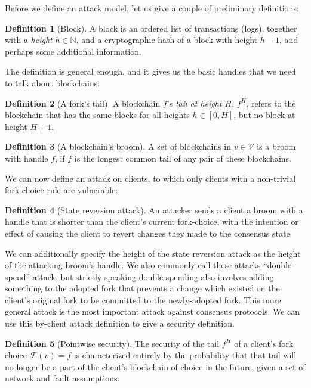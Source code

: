 \documentclass[11pt,a4paper]{article}
\theoremstyle{plain}
\theoremstyle{definition}
\newtheorem{defn}{Definition}
\begin{document}
Before we define an attack model, let us give a couple of preliminary definitions:

\begin{defn}[Block]
A block is an ordered list of transactions (logs), together with a \emph{height} $h \in \mathbb{N}$, and a cryptographic hash of a block with height $h - 1$, and perhaps some additional information. 
\end{defn}

The definition is general enough, and it gives us the basic handles that we need to talk about blockchains:

\begin{defn}[A fork's tail]
A blockchain $f$'s \emph{tail at height $H$}, $f^H$, refers to the blockchain that has the same blocks for all heights $h \in [0,H]$, but no block at height $H + 1$.
\end{defn}

\begin{defn}[A blockchain's broom]
A set of blockchains in $v \in \mathcal{V}$ is a broom with handle $f$, if $f$ is the longest common tail of any pair of these blockchains.
\end{defn}

We can now define an attack on clients, to which only clients with a non-trivial fork-choice rule are vulnerable:

\begin{defn}[State reversion attack]
An attacker sends a client a broom with a handle that is shorter than the client's current fork-choice, with the intention or effect of causing the client to revert changes they made to the consensus state.
\end{defn}

We can additionally specify the height of the state reversion attack as the height of the attacking broom's handle. We also commonly call these attacks ``double-spend'' attack, but strictly speaking double-spending also involves adding something to the adopted fork that prevents a change which existed on the client's original fork to be committed to the newly-adopted fork. This more general attack is the most important attack against consensus protocols. We can use this by-client attack definition to give a security definition.

\begin{defn}[Pointwise security]
The security of the tail $f^H$ of a client's fork choice $\mathcal{F}(v) = f$ is characterized entirely by the probability that that tail will no longer be a part of the client's blockchain of choice in the future, given a set of network and fault assumptions. 
\end{defn}
\end{document}

